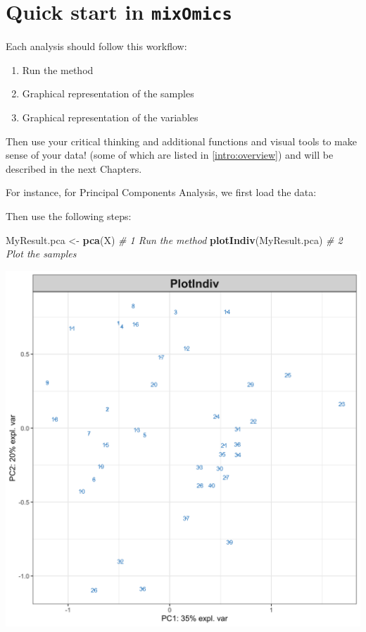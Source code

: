 \documentclass[]{book}
\newenvironment{Shaded}{\begin{snugshade}}{\end{snugshade}}
\newcommand{\CommentTok}[1]{\textcolor[rgb]{0.56,0.35,0.01}{\textit{#1}}}
\newcommand{\KeywordTok}[1]{\textcolor[rgb]{0.13,0.29,0.53}{\textbf{#1}}}
\newcommand{\NormalTok}[1]{#1}
\newcommand{\OperatorTok}[1]{\textcolor[rgb]{0.81,0.36,0.00}{\textbf{#1}}}
\newcommand{\StringTok}[1]{\textcolor[rgb]{0.31,0.60,0.02}{#1}}
\providecommand{\tightlist}{%
  \setlength{\itemsep}{0pt}\setlength{\parskip}{0pt}}
\begin{document}
\hypertarget{start:PCA}{%
\section{\texorpdfstring{Quick start in \texttt{mixOmics}}{Quick start in mixOmics}}\label{start:PCA}}

Each analysis should follow this workflow:

\begin{enumerate}
\def\labelenumi{\arabic{enumi}.}
\tightlist
\item
  Run the method
\item
  Graphical representation of the samples
\item
  Graphical representation of the variables
\end{enumerate}

Then use your critical thinking and additional functions and visual tools to make sense of your data! (some of which are listed in \ref{intro:overview}) and will be described in the next Chapters.

For instance, for Principal Components Analysis, we first load the data:

\begin{Shaded}
\end{Shaded}

Then use the following steps:

\begin{Shaded}
\begin{Highlighting}[]
\NormalTok{MyResult.pca <-}\StringTok{ }\KeywordTok{pca}\NormalTok{(X)  }\CommentTok{# 1 Run the method}
\KeywordTok{plotIndiv}\NormalTok{(MyResult.pca) }\CommentTok{# 2 Plot the samples}
\end{Highlighting}
\end{Shaded}

\begin{center}\includegraphics[width=0.75\linewidth,]{Figures/02-pca-nutrimouse-1} \end{center}
\end{document}
